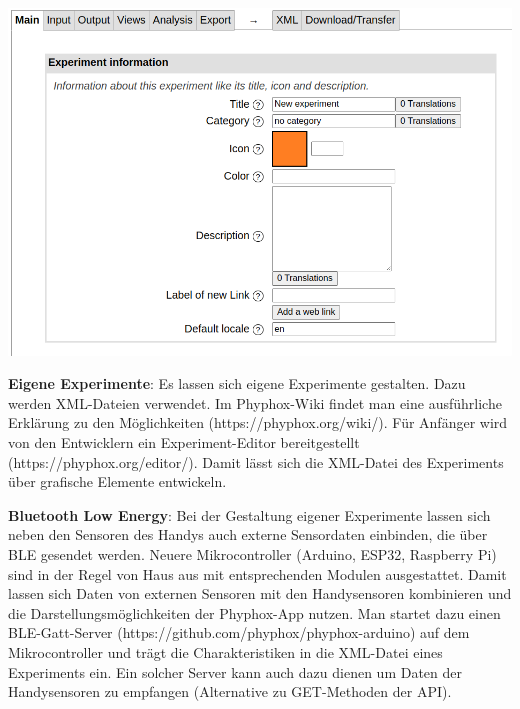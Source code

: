 \documentclass[../main.tex]{subfiles}
\begin{document}
\begin{tcolorbox}
    \vspace{0.5cm}
    \begin{minipage}[]{0.45\textwidth} 
        \includegraphics[width=\textwidth]{img/editor}
    \end{minipage}
    \hspace{0.2cm}
    \begin{minipage}[]{0.5\textwidth} 
    \textbf{Eigene Experimente}: Es lassen sich eigene Experimente gestalten. Dazu werden XML-Dateien verwendet. Im Phyphox-Wiki findet man eine ausführliche Erklärung zu den Möglichkeiten (https://phyphox.org/wiki/). Für Anfänger wird von den Entwicklern ein Experiment-Editor bereitgestellt (https://phyphox.org/editor/). Damit lässt sich die XML-Datei des Experiments über grafische Elemente entwickeln. 
    \end{minipage}
    
    \vspace{0.5cm}
    \textbf{Bluetooth Low Energy}: Bei der Gestaltung eigener Experimente lassen sich neben den Sensoren des Handys auch externe Sensordaten einbinden, die über BLE gesendet werden. Neuere Mikrocontroller (Arduino, ESP32, Raspberry Pi) sind in der Regel von Haus aus mit entsprechenden Modulen ausgestattet. Damit lassen sich Daten von externen Sensoren mit den Handysensoren kombinieren und die Darstellungsmöglichkeiten der Phyphox-App nutzen. Man startet dazu einen BLE-Gatt-Server (https://github.com/phyphox/phyphox-arduino) auf dem Mikrocontroller und trägt die Charakteristiken in die XML-Datei eines Experiments ein. Ein solcher Server kann auch dazu dienen um Daten der Handysensoren zu empfangen (Alternative zu GET-Methoden der API).    
\end{tcolorbox}
\end{document}
